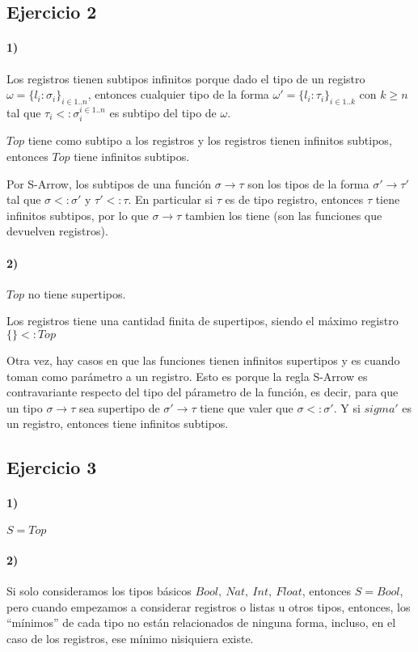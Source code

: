 \documentclass[10pt,a4paper, landscape]{article}
\begin{document}
	\subsection{Ejercicio 2}
	\begin{multicols}{2}
		\paragraph{1)} Los registros tienen subtipos infinitos porque dado el tipo de un registro $\omega = \{l_i:\sigma_i\}_{i\in 1..n}$, entonces cualquier tipo de la forma $\omega' = \{l_i:\tau_i\}_{i\in 1..k}$ con $k \geq n$ tal que  $\tau_i <: \sigma_i^{i\in 1..n}$ es subtipo del tipo de $\omega$.
		
		$Top$ tiene como subtipo a los registros y los registros tienen infinitos subtipos, entonces $Top$ tiene infinitos subtipos.
		
		Por S-Arrow, los subtipos de una función $\sigma\to\tau$ son los tipos de la forma $\sigma' \to \tau'$ tal que $\sigma <: \sigma'$ y $\tau' <: \tau$. En particular si $\tau$ es de tipo registro, entonces $\tau$ tiene infinitos subtipos, por lo que $\sigma\to\tau$ tambien los tiene (son las funciones que devuelven registros). 
		
		\paragraph{2)} $Top$ no tiene supertipos.
		
		Los registros tiene una cantidad finita de supertipos, siendo el máximo registro $\{\} <: Top$
		
		Otra vez, hay casos en que las funciones tienen infinitos supertipos y es cuando toman como parámetro a un registro. Esto es porque la regla S-Arrow es contravariante respecto del tipo del párametro de la función, es decir, para que un tipo $\sigma\to\tau$ sea supertipo de $\sigma'\to\tau$ tiene que valer que $\sigma <: \sigma'$. Y si $sigma'$ es un registro, entonces tiene infinitos subtipos.
		
		\vfill\null
		\columnbreak
		\subsection{Ejercicio 3}
		
		\paragraph{1)} $S = Top$
		\paragraph{2)} Si solo consideramos los tipos básicos $Bool,~Nat,~Int,~Float$, entonces $S=Bool$, pero cuando empezamos a considerar registros o listas u otros tipos, entonces, los ``mínimos'' de cada tipo no están relacionados de ninguna forma, incluso, en el caso de los registros, ese mínimo nisiquiera existe.

\end{multicols}
\end{document}
